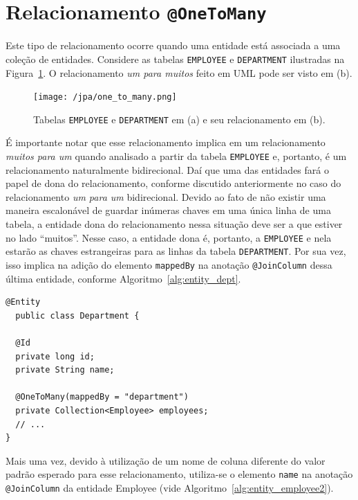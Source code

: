 \documentclass[
  10.5pt,				  %
	openright,			%
	twoside,			  %
  a5paper,
  chapter=TITLE,	%
	section=TITLE,	%
  hyphens,        %
	english,        %
	brazil          %
]{abntex2}
\begin{document}
\section{Relacionamento \texttt{@OneToMany}}

Este tipo de relacionamento ocorre quando uma entidade está associada a uma coleção de entidades. Considere as tabelas \texttt{EMPLOYEE} e \texttt{DEPARTMENT} ilustradas na Figura~\ref{fig:jpa_onetomany}. O relacionamento \emph{um para muitos} feito em UML pode ser visto em (b).

\begin{figure}[!ht]
  \caption{\label{fig:jpa_onetomany} Tabelas \texttt{EMPLOYEE} e \texttt{DEPARTMENT} em (a) e seu relacionamento em (b).}
  \begin{center}
    \texttt{[image: /jpa/one\_to\_many.png]}
  \end{center}
\end{figure}


É importante notar que esse relacionamento implica em um relacionamento \emph{muitos para um} quando analisado a partir da tabela \texttt{EMPLOYEE} e, portanto, é um relacionamento naturalmente bidirecional. Daí que uma das entidades fará o papel de dona do relacionamento, conforme discutido anteriormente no caso do relacionamento \emph{um para um} bidirecional. Devido ao fato de não existir uma maneira escalonável de guardar inúmeras chaves em uma única linha de uma tabela, a entidade dona do relacionamento nessa situação deve ser a que estiver no lado ``muitos''. Nesse caso, a entidade dona é, portanto, a \texttt{EMPLOYEE} e nela estarão as chaves estrangeiras para as linhas da tabela \texttt{DEPARTMENT}. Por sua vez, isso implica na adição do elemento \texttt{mappedBy} na anotação \texttt{@JoinColumn} dessa última entidade, conforme Algoritmo~\ref{alg:entity_dept}.

\begin{lstlisting}[caption={Classe Department e seus relacionamentos.}, label={alg:entity_dept}]
@Entity
  public class Department {

  @Id
  private long id;
  private String name;

  @OneToMany(mappedBy = "department")
  private Collection<Employee> employees;
  // ...
}
\end{lstlisting}
%

Mais uma vez, devido à utilização de um nome de coluna diferente do valor padrão esperado para esse relacionamento, utiliza-se o elemento \texttt{name} na anotação \texttt{@JoinColumn} da entidade Employee (vide Algoritmo~\ref{alg:entity_employee2}).
\end{document}

